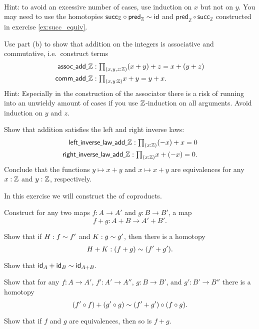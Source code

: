 \begin{exercises}
\begin{subexenum}
\begin{align*}
\end{align*}
Hint: to avoid an excessive number of cases, use induction on $x$ but not on $y$. You may need to use the homotopies $\mathsf{succ}_{\mathbb{Z}}\circ \mathsf{pred}_{\mathbb{Z}}\htpy \idfunc$ and $\mathsf{pred}_{\mathbb{Z}}\circ\mathsf{succ}_{\mathbb{Z}}$ constructed in exercise \cref{ex:succ_equiv}.
\item Use part (b) to show that addition on the integers is associative and commutative, i.e.~construct terms
\begin{align*}
\mathsf{assoc\usc{}add\usc{}}\Z & : \prd{x,y,z:\Z} (x+y)+z = x + (y+z) \\
\mathsf{comm\usc{}add\usc{}}\Z & : \prd{x,y:\Z} x+y = y+x.
\end{align*}
Hint: Especially in the construction of the associator there is a risk of running into an unwieldy amount of cases if you use $\Z$-induction on all arguments. Avoid induction on $y$ and $z$.
\item Show that addition satisfies the left and right inverse laws:
\begin{align*}
\mathsf{left\usc{}inverse\usc{}law\usc{}add\usc{}}\Z : \prd{x : \Z} (-x)+x=0 \\
\mathsf{right\usc{}inverse\usc{}law\usc{}add\usc{}}\Z : \prd{x : \Z} x + (-x)=0.
\end{align*}
Conclude that the functions $y \mapsto x + y$ and $x\mapsto x + y$ are equivalences for any $x:\Z$ and $y:\Z$, respectively.
\end{subexenum}
\item \label{ex:coproduct_functor}In this exercise we will construct the  of coproducts.
\begin{subexenum}
\item Construct for any two maps $f:A \to A'$ and $g:B \to B'$, a map
\begin{equation*}
f+g:A+B \to A'+B'.
\end{equation*}
\item Show that if $H:f\htpy f'$ and $K:g\htpy g'$, then there is a homotopy
\begin{equation*}
H+K:(f+g)\htpy (f'+g').
\end{equation*}
\item Show that $\idfunc[A]+\idfunc[B]\htpy \idfunc[A+B]$.
\item Show that for any $f:A\to A'$, $f':A'\to A''$, $g:B\to B'$, and $g':B'\to B''$ there is a homotopy
\begin{equation*}
(f'\circ f)+(g'\circ g) \htpy (f'+g')\circ (f\circ g).
\end{equation*}
\item Show that if $f$ and $g$ are equivalences, then so is $f+g$. \label{ex:coproduct_functor_equivalence}
\end{subexenum}
\end{exercises}
